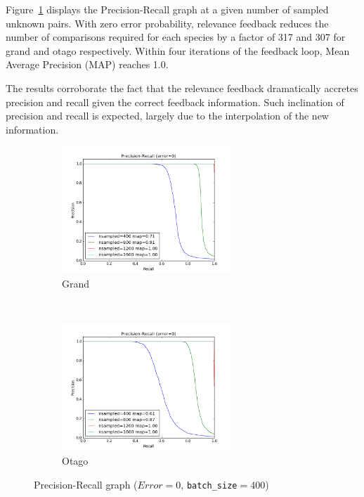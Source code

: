 Figure~\ref{fig:pr_curves} displays the Precision-Recall graph at a given
number of sampled unknown pairs. With zero error probability, relevance
feedback reduces the number of comparisons required for each species by a
factor of 317 and 307 for grand and otago respectively. Within four iterations
of the feedback loop, Mean Average Precision (MAP) reaches 1.0.

The results corroborate the fact that the relevance feedback dramatically
accretes precision and recall given the correct feedback information. Such
inclination of precision and recall is expected, largely due to the
interpolation of the new information.

\begin{figure}[htbp]
  \centering
  \begin{subfigure}[t]{\textwidth}
      \centering
      \includegraphics[width=0.7\textwidth]{pr/grand}
      \caption{Grand}
  \end{subfigure}%
  ~\\
  \begin{subfigure}[t]{\textwidth}
      \centering
      \includegraphics[width=0.7\textwidth]{pr/otago}
      \caption{Otago}
  \end{subfigure}%
  \captionsetup{justification=centering}
  \caption{Precision-Recall graph ($Error=0$, \texttt{batch\_size}$=400$)}
  \label{fig:pr_curves} %
\end{figure}

